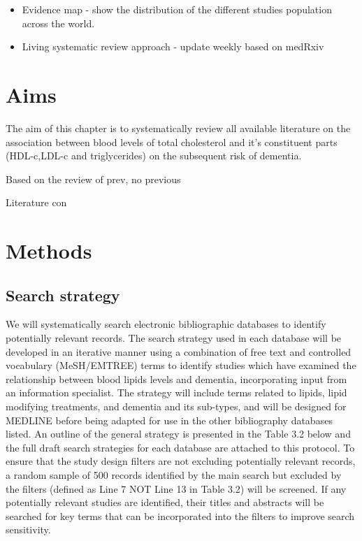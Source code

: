 \documentclass[a4paper, twoside]{templates/ociamthesis}
\providecommand{\tightlist}{%
  \setlength{\itemsep}{0pt}\setlength{\parskip}{0pt}}
\begin{document}
\begin{itemize}
\tightlist
\item
  Evidence map - show the distribution of the different studies population across the world.
\item
  Living systematic review approach - update weekly based on medRxiv
\end{itemize}

\hypertarget{aims}{%
\section{Aims}\label{aims}}

The aim of this chapter is to systematically review all available literature on the association between blood levels of total cholesterol and it's constituent parts (HDL-c,LDL-c and triglycerides) on the subsequent risk of dementia.

Based on the review of prev, no previous

Literature con

\hypertarget{methods}{%
\section{Methods}\label{methods}}

\hypertarget{search-strategy}{%
\subsection{Search strategy}\label{search-strategy}}

We will systematically search electronic bibliographic databases to identify potentially relevant records. The search strategy used in each database will be developed in an iterative manner using a combination of free text and controlled vocabulary (MeSH/EMTREE) terms to identify studies which have examined the relationship between blood lipids levels and dementia, incorporating input from an information specialist. The strategy will include terms related to lipids, lipid modifying treatments, and dementia and its sub-types, and will be designed for MEDLINE before being adapted for use in the other bibliography databases listed. An outline of the general strategy is presented in the Table 3.2 below and the full draft search strategies for each database are attached to this protocol. To ensure that the study design filters are not excluding potentially relevant records, a random sample of 500 records identified by the main search but excluded by the filters (defined as Line 7 NOT Line 13 in Table 3.2) will be screened. If any potentially relevant studies are identified, their titles and abstracts will be searched for key terms that can be incorporated into the filters to improve search sensitivity.
\end{document}
